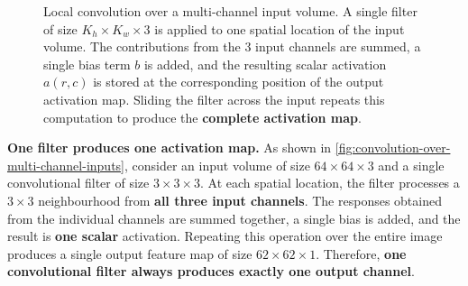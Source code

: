 \begin{figure}[!htp]
    \caption{Local convolution over a multi-channel input volume. A single filter of size $K_h \times K_w \times 3$ is applied to one spatial location of the input volume. The contributions from the 3 input channels are summed, a single bias term $b$ is added, and the resulting scalar activation $a(r,c)$ is stored at the corresponding position of the output activation map. Sliding the filter across the input repeats this computation to produce the \textbf{complete activation map}.}
    \label{fig:convolution-over-multi-channel-inputs}
\end{figure}

\noindent
\textcolor{Green3}{ \textbf{One filter produces one activation map.}} As shown in \autoref{fig:convolution-over-multi-channel-inputs}, consider an input volume of size $64 \times 64 \times 3$ and a single convolutional filter of size $3 \times 3 \times 3$. At each spatial location, the filter processes a $3 \times 3$ neighbourhood from \textbf{all three input channels}. The responses obtained from the individual channels are summed together, a single bias is added, and the result is \textbf{one scalar} activation. Repeating this operation over the entire image produces a single output feature map of size $62 \times 62 \times 1$. Therefore, \textbf{one convolutional filter always produces exactly one output channel}.

